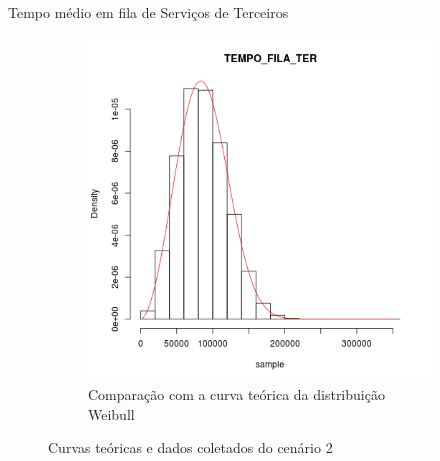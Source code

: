 \documentclass[xcolor=dvipsnames]{beamer}
\begin{document}
\begin{frame}{Tempo médio em fila de Serviços de Terceiros}
\begin{figure}[H]
\begin{subfigure}[H]{0.4\textwidth}
			\includegraphics[width=\textwidth]{img/C2-hist-weibull-TEMPO_FILA_TER.png}
			\caption{Comparação com a curva teórica da distribuição Weibull}
			\label{fig:C2-wei}
		\end{subfigure}
		\caption{Curvas teóricas e dados coletados do cenário 2}
	\end{figure}
\end{frame}
	
\end{document}
